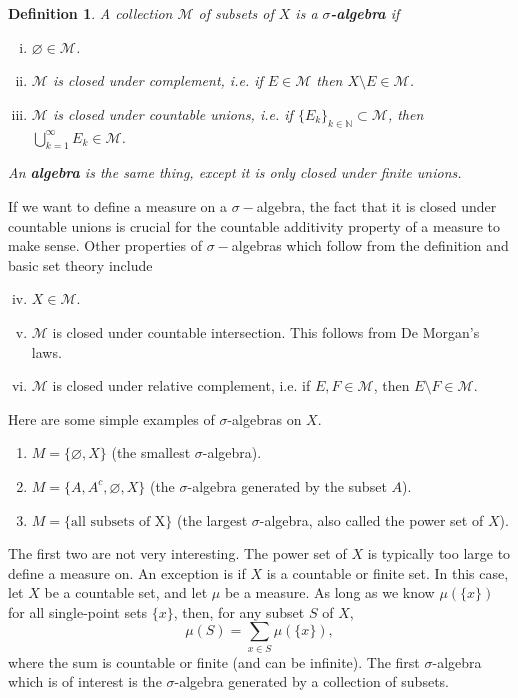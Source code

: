 \documentclass[12pt]{amsart}         %
\newtheorem{definition}{Definition}[section]
\theoremstyle{remark}
\newcommand{\N}{\mathbb{N}}
\begin{document}
\begin{definition}A collection $\mathcal{M}$ of subsets of $X$ is a \textbf{$\sigma$-algebra} if 
\begin{enumerate}[(i)]
	\item $\varnothing \in \mathcal{M}$.
	\item $\mathcal{M}$ is closed under complement, i.e. if $E \in \mathcal{M}$ then $X\setminus E \in \mathcal{M}$.
	\item $\mathcal{M}$ is closed under countable unions, i.e. if 
    $\{E_k\}_{k \in \N} \subset \mathcal{M}$, then $\bigcup_{k=1}^\infty E_k \in \mathcal{M}$.
\end{enumerate}
An \textbf{algebra} is the same thing, except it is only closed under finite unions.
\end{definition}

If we want to define a measure on a $\sigma-$algebra, the fact that it is closed under countable unions is crucial for the countable additivity property of a measure to make sense. Other properties of $\sigma-$algebras which follow from the definition and basic set theory include
\begin{enumerate}[(i)]\setcounter{enumi}{3}
	\item $X \in \mathcal{M}$.
	\item $\mathcal{M}$ is closed under countable intersection. This follows from De Morgan's laws.
	\item $\mathcal{M}$ is closed under relative complement, i.e. if $E, F \in \mathcal{M}$, then $E \setminus F \in \mathcal{M}$.
\end{enumerate}

Here are some simple examples of $\sigma$-algebras on $X$.
\begin{enumerate}
    \item $M = \{ \varnothing, X \}$ (the smallest $\sigma$-algebra).
    \item $M = \{ A, A^c, \varnothing, X\}$ (the $\sigma$-algebra generated by the subset $A$).
    \item $M = \{ \text{all subsets of X} \}$ (the largest $\sigma$-algebra, also called the power set of $X$).
\end{enumerate}

The first two are not very interesting. The power set of $X$ is typically too large to define a measure on. An exception is if $X$ is a countable or finite set. In this case, let $X$ be a countable set, and let $\mu$ be a measure. As long as we know $\mu(\{x\})$ for all single-point sets $\{x\}$, then, for any subset $S$ of $X$,
\[
\mu(S) = \sum_{x \in S} \mu(\{x\}),
\]
where the sum is countable or finite (and can be infinite). The first $\sigma$-algebra which is of interest is the $\sigma$-algebra generated by a collection of subsets.
\end{document}

